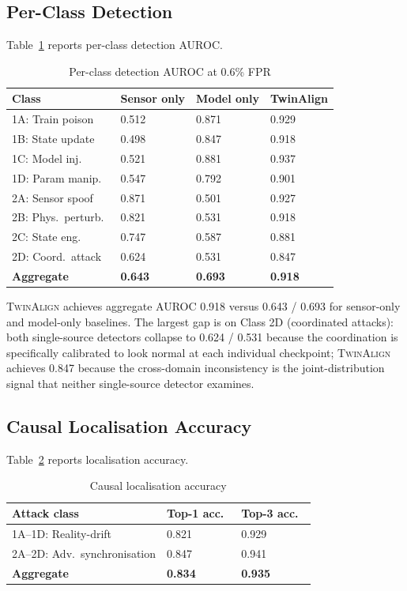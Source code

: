 \documentclass[sigconf,nonacm]{acmart}
\begin{document}
\subsection{Per-Class Detection}

Table~\ref{tab:perclass} reports per-class detection AUROC.

\begin{table}[h]
\caption{Per-class detection AUROC at 0.6\% FPR}
\label{tab:perclass}
\small
\begin{tabularx}{\columnwidth}{@{}p{2.6cm}X X X@{}}
\toprule
\textbf{Class} & \textbf{Sensor only} & \textbf{Model only} & \textbf{TwinAlign} \\
\midrule
1A: Train poison & 0.512 & 0.871 & 0.929 \\
1B: State update & 0.498 & 0.847 & 0.918 \\
1C: Model inj.\  & 0.521 & 0.881 & 0.937 \\
1D: Param manip.\  & 0.547 & 0.792 & 0.901 \\
2A: Sensor spoof & 0.871 & 0.501 & 0.927 \\
2B: Phys.\ perturb.\  & 0.821 & 0.531 & 0.918 \\
2C: State eng.\  & 0.747 & 0.587 & 0.881 \\
2D: Coord.\ attack & 0.624 & 0.531 & 0.847 \\
\midrule
\textbf{Aggregate} & \textbf{0.643} & \textbf{0.693} & \textbf{0.918} \\
\bottomrule
\end{tabularx}
\end{table}

\textsc{TwinAlign} achieves aggregate AUROC 0.918 versus 0.643 /
0.693 for sensor-only and model-only baselines. The largest gap
is on Class 2D (coordinated attacks): both single-source
detectors collapse to 0.624 / 0.531 because the coordination is
specifically calibrated to look normal at each individual
checkpoint; \textsc{TwinAlign} achieves 0.847 because the
cross-domain inconsistency is the joint-distribution signal that
neither single-source detector examines.

\subsection{Causal Localisation Accuracy}

Table~\ref{tab:localisation} reports localisation accuracy.

\begin{table}[h]
\caption{Causal localisation accuracy}
\label{tab:localisation}
\small
\begin{tabularx}{\columnwidth}{@{}p{2.6cm}X X@{}}
\toprule
\textbf{Attack class} & \textbf{Top-1 acc.\ } & \textbf{Top-3 acc.\ } \\
\midrule
1A--1D: Reality-drift          & 0.821 & 0.929 \\
2A--2D: Adv.\ synchronisation  & 0.847 & 0.941 \\
\midrule
\textbf{Aggregate}             & \textbf{0.834} & \textbf{0.935} \\
\bottomrule
\end{tabularx}
\end{table}
\end{document}
